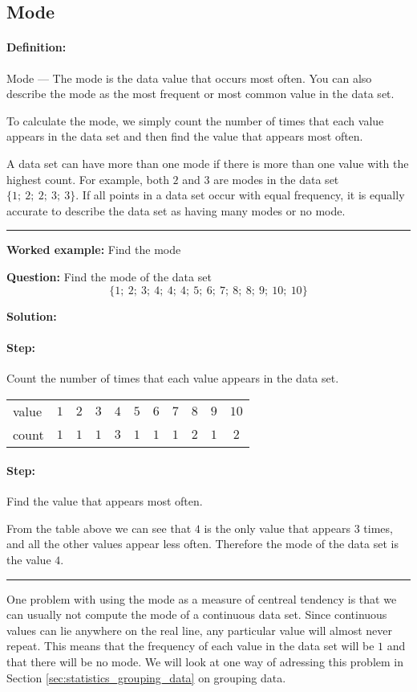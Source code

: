 \documentclass[a4paper,11pt]{report}
\def\Definition#1#2{\paragraph{Definition:} #1 --- #2}
\newenvironment{wex}[3]%
{\rule{\linewidth}{0.5mm}
\textbf{Worked example:} #1

\textbf{Question:} #2

\textbf{Solution:} #3}%
{\rule{\linewidth}{0.5mm}}
\newcommand{\westep}[1]{\paragraph{Step:} #1}
\begin{document}
\subsection{Mode}
\Definition{Mode}{The mode is the data value that occurs most
  often. You can also describe the mode as the most frequent or most
  common value in the data set.}

To calculate the mode, we simply count the number of times that each
value appears in the data set and then find the value that appears
most often.

A data set can have more than one mode if there is more than one value
with the highest count. For example, both $2$ and $3$ are modes in the
data set $\{1;\ 2;\ 2;\ 3;\ 3\}$. If all points in a data set occur
with equal frequency, it is equally accurate to describe the data set
as having many modes or no mode.

\begin{wex}{Find the mode}{
    Find the mode of the data set
    \begin{equation}
      \{1;\ 2;\ 3;\ 4;\ 4;\ 4;\ 5;\ 6;\ 7;\ 8;\ 8;\ 9;\ 10;\ 10\}
    \end{equation}
}{
  \westep{Count the number of times that each value appears in the data
    set.}
  \begin{center}
    \begin{tabular}{lcccccccccc}
      \toprule
      value & $1$ & $2$ & $3$ & $4$ & $5$ & $6$ & $7$ & $8$ & $9$ & $10$ \\
      count & $1$ & $1$ & $1$ & $3$ & $1$ & $1$ & $1$ & $2$ & $1$ & $2$  \\
      \bottomrule
    \end{tabular}
  \end{center}

  \westep{Find the value that appears most often.}

  From the table above we can see that $4$ is the only value that
  appears $3$ times, and all the other values appear less
  often. Therefore the mode of the data set is the value $4$.

}
\end{wex}

One problem with using the mode as a measure of centreal tendency is
that we can usually not compute the mode of a continuous data
set. Since continuous values can lie anywhere on the real line, any
particular value will almost never repeat. This means that the
frequency of each value in the data set will be $1$ and that there will
be no mode. We will look at one way of adressing this problem in
Section \ref{sec:statistics_grouping_data} on grouping data.
\end{document}
